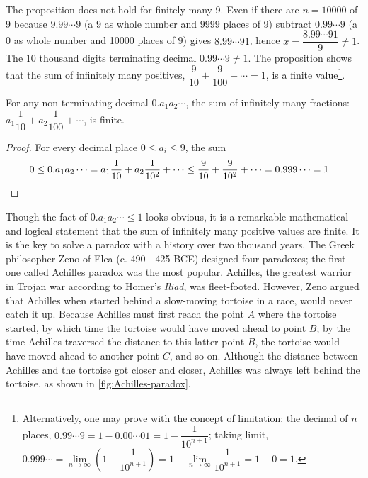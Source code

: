 \documentclass[b5paper]{article}
\begin{document}
The proposition does not hold for finitely many 9. Even if there are $n = 10000$ of 9 because $9.99\cdots9$ (a 9 as whole number and 9999 places of 9) subtract $0.99\cdots9$ (a 0 as whole number and 10000 places of 9) gives $8.99\cdots91$, hence $x = \dfrac{8.99\cdots91}{9} \ne 1$. The 10 thousand digits terminating decimal $0.99\cdots9 \ne 1$. The proposition shows that the sum of infinitely many positives, $\dfrac{9}{10} + \dfrac{9}{100} + \cdots = 1$, is a finite value\footnote{Alternatively, one may prove with the concept of limitation: the decimal of $n$ places, $0.99\cdots9 = 1 - 0.00\cdots01 = 1 - \dfrac{1}{10^{n+1}}$; taking limit, $0.999\cdots = \lim\limits_{n\to\infty} (1 - \dfrac{1}{10^{n+1}}) = 1 - \lim\limits_{n\to\infty} \dfrac{1}{10^{n+1}} = 1 - 0 = 1$.}.

\begin{corollary}
  For any non-terminating decimal $0.a_1a_2\cdots$, the sum of infinitely many fractions: $a_1 \dfrac{1}{10} + a_2 \dfrac{1}{100} + \cdots$, is finite.
\end{corollary}

\begin{proof}
  For every decimal place $0 \leq a_i \leq 9$, the sum
  \begin{align*}
0 \leq 0.a_1 a_2 \cdots = a_1\frac{1}{10} + a_2\frac{1}{10^2} + \cdots \leq \frac{9}{10} + \frac{9}{10^2} + \cdots = 0.999\cdots = 1 & \qedhere
  \end{align*}
\end{proof}

Though the fact of $0.a_1a_2\cdots \leq 1$ looks obvious, it is a remarkable mathematical and logical statement that the sum of infinitely many positive values are finite. It is the key to solve a paradox with a history over two thousand years. The Greek philosopher Zeno of Elea (c. 490 - 425 BCE) designed four paradoxes; the first one called Achilles paradox was the most popular. Achilles, the greatest warrior in Trojan war according to Homer's \emph{Iliad}, was fleet-footed. However, Zeno argued that Achilles when started behind a slow-moving tortoise in a race, would never catch it up. Because Achilles must first reach the point $A$ where the tortoise started, by which time the tortoise would have moved ahead to point $B$; by the time Achilles traversed the distance to this latter point $B$, the tortoise would have moved ahead to another point $C$, and so on. Although the distance between Achilles and the tortoise got closer and closer, Achilles was always left behind the tortoise, as shown in \cref{fig:Achilles-paradox}.
\end{document}
